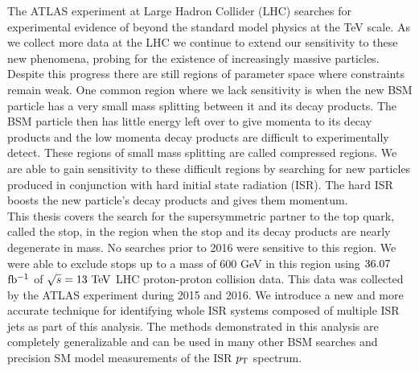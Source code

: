 
\indent The ATLAS experiment at Large Hadron Collider (LHC) searches for experimental evidence of beyond the standard model physics at the TeV scale.   As we collect more data at the LHC we continue to extend our sensitivity to these new phenomena, probing for the existence of increasingly massive particles.  Despite this progress there are still regions of parameter space where constraints remain weak.   One common region where we lack sensitivity is when the new BSM particle has a very small mass splitting between it and its decay products.  The BSM particle then has little energy left over to give momenta to its decay products and the low momenta decay products are difficult to experimentally detect. These regions of small mass splitting are called compressed regions.  We are able to gain sensitivity to these difficult regions by searching for new particles produced in conjunction with hard initial state radiation (ISR).  The hard ISR boosts the new particle's decay products and gives them momentum.  \\

\indent This thesis covers the search for the supersymmetric partner to the top quark, called the stop, in the region when the stop and its decay products are nearly degenerate in mass.  No searches prior to 2016 were sensitive to this region.  We were able to exclude stops up to a mass of 600 GeV in this region using $36.07$ $\mbox{fb$^{-1}$}$ of $\sqrt{s} = 13 \tev$ LHC proton-proton collision data.  This data was collected by the ATLAS experiment during 2015 and 2016. We introduce a new and more accurate technique for identifying whole ISR systems composed of multiple ISR jets  as part of this analysis.   The methods demonstrated in this analysis are completely generalizable and can be used in many other BSM searches and precision SM model measurements of the ISR $p_{\mathrm{T}}$ spectrum.